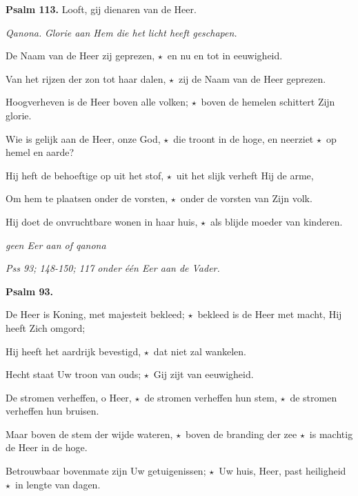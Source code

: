 \documentclass[12pt,twoside,a5paper]{article}
\newlength{\origparskip}
\newenvironment{halfparskip}{
  \setlength{\parskip}{0.5\origparskip}
}{
  \setlength{\parskip}{\origparskip}
}
\newcommand{\sep}{{\color{BrickRed} \textbf{$\star$}}}
\newcommand{\liturgicalhint}[1]{{\color{BrickRed}\footnotesize\itshape{#1}}}
\newcommand{\liturgicaloption}[1]{{\color{BrickRed}\textbf{#1}}}
\newcommand{\qanona}[1]{{\liturgicalhint{Qanona.}} \emph{#1}}
\newcommand{\psalm}[1]{\liturgicaloption{Psalm #1.}}
\begin{document}
\begin{halfparskip}
  \psalm{113} Looft, gij dienaren van de Heer.

  \qanona{Glorie aan Hem die het licht heeft geschapen.}

  De Naam van de Heer zij geprezen, \sep\ en nu en tot in eeuwigheid.

  Van het rijzen der zon tot haar dalen, \sep\ zij de Naam van de Heer geprezen.

  Hoogverheven is de Heer boven alle volken; \sep\ boven de hemelen schittert Zijn glorie.

  Wie is gelijk aan de Heer, onze God, \sep\ die troont in de hoge, en neerziet \sep\ op hemel en aarde?

  Hij heft de behoeftige op uit het stof, \sep\ uit het slijk verheft Hij de arme,

  Om hem te plaatsen onder de vorsten, \sep\ onder de vorsten van Zijn volk.

  Hij doet de onvruchtbare wonen in haar huis, \sep\ als blijde moeder van kinderen.

  \liturgicalhint{geen Eer aan of qanona}
\end{halfparskip}

\liturgicalhint{Pss 93; 148-150; 117 onder één Eer aan de Vader.}

\begin{halfparskip}
  \psalm{93}

  De Heer is Koning, met majesteit bekleed; \sep\ bekleed is de Heer met macht, Hij heeft Zich omgord;

  Hij heeft het aardrijk bevestigd, \sep\ dat niet zal wankelen.

  Hecht staat Uw troon van ouds; \sep\ Gij zijt van eeuwigheid.

  De stromen verheffen, o Heer, \sep\ de stromen verheffen hun stem, \sep\ de stromen verheffen hun bruisen.

  Maar boven de stem der wijde wateren, \sep\ boven de branding der zee \sep\ is machtig de Heer in de hoge.

  Betrouwbaar bovenmate zijn Uw getuigenissen; \sep\ Uw huis, Heer, past heiligheid \sep\ in lengte van dagen.
\end{halfparskip}
\end{document}
